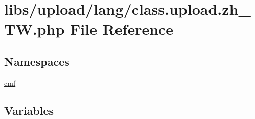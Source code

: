 \hypertarget{class_8upload_8zh___t_w_8php}{}\section{libs/upload/lang/class.upload.\+zh\+\_\+\+T\+W.\+php File Reference}
\label{class_8upload_8zh___t_w_8php}
\subsection*{Namespaces}
\begin{DoxyCompactItemize}
\item 
 \hyperlink{namespacecmf}{cmf}
\end{DoxyCompactItemize}
\subsection*{Variables}
